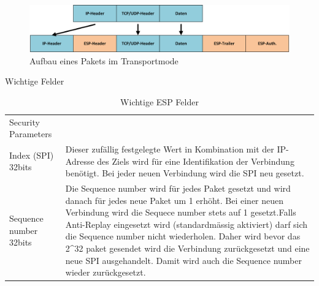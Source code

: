 \begin{figure}[ht]
    \begin{center}
        \includegraphics[trim=1 0 0 0,clip,width=\textwidth]{mainpart/analyse/img/ESP_Transportmode.png}
    \end{center}
    \caption{Aufbau eines Pakets im Transportmode}
\end{figure}


\noindent Wichtige Felder

\begin{table}[H]
\begin{tabularx}{\textwidth}{l|>{\raggedright\arraybackslash}X} 
        \hline
        Security Parameters\\ Index (SPI) 32bits & Dieser zufällig festgelegte Wert in Kombination mit der IP-Adresse des Ziels wird für eine Identifikation der Verbindung benötigt. Bei jeder neuen Verbindung wird die SPI neu gesetzt.                                                                                                                                                                                                                                                                         \\ \hline
        Sequence number 32bits                 & Die Sequence number wird für jedes Paket gesetzt und wird danach für jedes neue Paket um 1 erhöht. Bei einer neuen Verbindung wird die Sequece number stets auf 1 gesetzt.Falls Anti-Replay eingesetzt wird (standardmässig aktiviert) darf sich die Sequence number nicht wiederholen. Daher wird bevor das 2\^{}32 paket gesendet wird die Verbindung zurückgesetzt und eine neue SPI ausgehandelt. Damit wird auch die Sequence number wieder zurückgesetzt. \\
        \hline
\end{tabularx}
\caption{Wichtige ESP Felder}
\end{table}